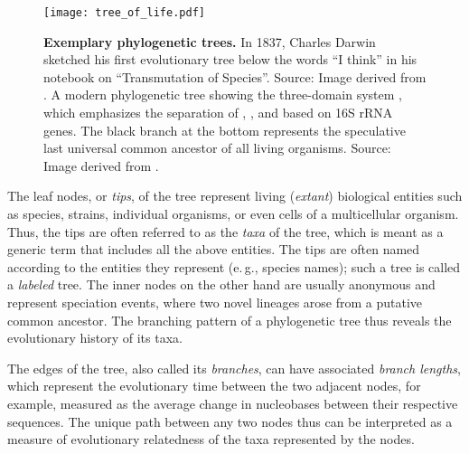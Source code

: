 \begin{figure}[hpbt]
    \centering
    \texttt{[image: tree\_of\_life.pdf]}
    \begin{subfigure}{0pt}
        \label{fig:tree_of_life:sub:darwin}
    \end{subfigure}
    \begin{subfigure}{0pt}
        \label{fig:tree_of_life:sub:woese}
    \end{subfigure}
    \caption[Exemplary phylogenetic trees]{
        \textbf{Exemplary phylogenetic trees.}
        In 1837, Charles Darwin sketched his first evolutionary tree below the words ``I think''
        in his notebook on ``Transmutation of Species''.
        Source: Image derived from \cite{DarwinTreeOfLife1837}.
        A modern phylogenetic tree showing the three-domain system \cite{Woese1977,Woese1990},
        which emphasizes the separation of , , and 
        based on 16S rRNA genes.
        The black branch at the bottom represents the speculative last universal common ancestor of all living organisms.
        Source: Image derived from \cite{WoeseTreeOfLife2006}.
    }
    \label{fig:tree_of_life}
\end{figure}

The leaf nodes, or \emph{tips}, of the tree represent living (\emph{extant}) biological entities
such as species, strains, individual organisms, or even cells of a multicellular organism.
Thus, the tips are often referred to as the \emph{taxa} of the tree,
which is meant as a generic term that includes all the above entities.
The tips are often named according to the entities they represent (e.\,g., species names);
such a tree is called a \emph{labeled} tree.
The inner nodes on the other hand are usually anonymous and
represent speciation events, where two novel lineages arose from a putative common ancestor.
The branching pattern of a phylogenetic tree thus reveals the evolutionary history of its taxa.

The edges of the tree, also called its \emph{branches}, can have associated \emph{branch lengths},
which represent the evolutionary time between the two adjacent nodes,
for example, measured as the average change in nucleobases between their respective sequences.
The unique path between any two nodes thus can be interpreted
as a measure of evolutionary relatedness of the taxa represented by the nodes.

